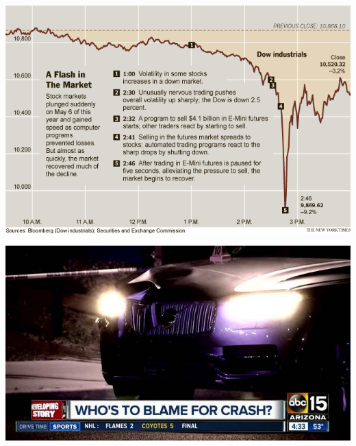 \begin{frame}
	\begin{center}
		\includegraphics[width=\textwidth]{flashcrash}
	\end{center}
\end{frame}

\begin{frame}
	\begin{center}
		\includegraphics[width=\textwidth]{uber_tempe_2}
	\end{center}
\end{frame}

